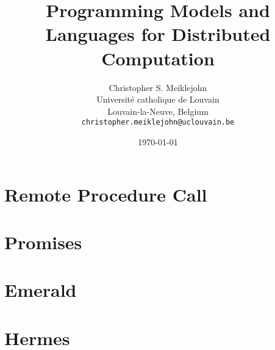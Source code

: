 \documentclass[11pt,twoside,a4paper]{article}
\theoremstyle{definition}
\theoremstyle{definition}
\theoremstyle{remark}
\begin{document}
\title{Programming Models and Languages for Distributed Computation}

\author{Christopher S. Meiklejohn\\
  Universit\'e catholique de Louvain\\
  Louvain-la-Neuve, Belgium\\
  \texttt{christopher.meiklejohn@uclouvain.be}}
  
\date{\today}
\maketitle
\clearpage

\tableofcontents

\clearpage

\section{Remote Procedure Call}

\clearpage

\section{Promises}

\clearpage

\section{Emerald}

\clearpage

\section{Hermes}

\clearpage



\end{document}
